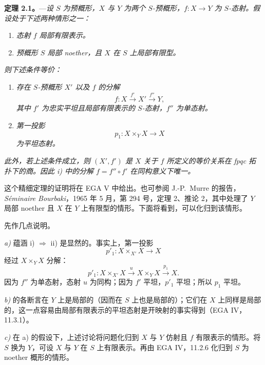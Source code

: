 \medskip
\noindent{}%
\textbf{定理 2.1。}---\textit{设 \(S\) 为预概形，\(X\) 与 \(Y\) 为两个 \(S\)-预概形，\(f:X\to Y\) 为 \(S\)-态射。假设处于下述两种情形之一：}
\begin{enumerate}
\renewcommand{\labelenumi}{\textit{\alph{enumi})}}
\item \textit{态射 \(f\) 局部有限表示。}
\item \textit{预概形 \(S\) 局部 noether，且 \(X\) 在 \(S\) 上局部有限型。}
\end{enumerate}
\noindent\textit{则下述条件等价：}
\begin{enumerate}
\renewcommand{\labelenumi}{\textit{\roman{enumi})}}
\item \textit{存在 \(S\)-预概形 \(X'\) 以及 \(f\) 的分解}
\[
  f:X\xrightarrow{\,f'\,}X'\xrightarrow{\,f''\,}Y,
\]
\textit{其中 \(f'\) 为忠实平坦且局部有限表示的 \(S\)-态射，\(f''\) 为单态射。}
\item \textit{第一投影}
\[
  p_1:X\times_Y X\longrightarrow X
\]
\textit{为平坦态射。}
\end{enumerate}
\noindent\textit{此外，若上述条件成立，则 \((X',f')\) 是 \(X\) 关于 \(f\) 所定义的等价关系在 fpqc 拓扑下的商。因此 i) 中的分解 \(f=f''\circ f'\) 在同构意义下唯一。}

这个精细定理的证明将在 EGA V 中给出。也可参阅 J.-P.~Murre 的报告，\textit{Séminaire Bourbaki}，1965 年 5 月，第 294 号，定理 2、推论 2，其中处理了 \(Y\) 局部 noether 且 \(X\) 在 \(Y\) 上有限型的情形。下面将看到，可以化归到该情形。

先作几点说明。

\medskip
\noindent\textit{a)} 蕴涵 i) \(\Rightarrow\) ii) 是显然的。事实上，第一投影
\[
  p'_1:X\times_{X'}X\longrightarrow X
\]
经过 \(X\times_Y X\) 分解：
\[
  p'_1:X\times_{X'}X\xrightarrow{\,u\,}
  X\times_Y X\xrightarrow{\,p_1\,}X.
\]
因为 \(f''\) 为单态射，态射 \(u\) 为同构；因为 \(f'\) 平坦，\(p'_1\) 平坦；所以 \(p_1\) 平坦。

\medskip
\noindent\textit{b)}  的各断言在 \(Y\) 上是局部的（因而在 \(S\) 上也是局部的）；它们在 \(X\) 上同样是局部的，这一点容易由局部有限表示的平坦态射是开映射的事实得到（EGA IV，11.3.1）。

\medskip
\noindent\textit{c)} 在  a) 的假设下，上述讨论将问题化归到 \(X\) 与 \(Y\) 仿射且 \(f\) 有限表示的情形。将 \(S\) 换为 \(Y\)，可设 \(X\) 与 \(Y\) 在 \(S\) 上有限表示。再由 EGA IV，11.2.6 化归到 \(S\) 为 noether 概形的情形。

